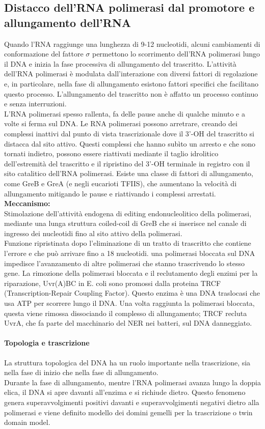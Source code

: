 \documentclass{article}
\begin{document}
\subsection{Distacco dell'RNA polimerasi dal promotore e
allungamento dell'RNA} 
Quando l'RNA raggiunge una lunghezza di 9-12
nucleotidi, alcuni cambiamenti di conformazione del fattore $\sigma$ permettono lo
scorrimento dell'RNA polimerasi lungo il DNA e inizia la fase processiva di
allungamento del trascritto. L'attività dell'RNA polimerasi è modulata dall'interazione con diversi fattori di regolazione e, in particolare, nella fase
di allungamento esistono fattori specifici che facilitano questo processo. L'allungamento del trascritto non è
affatto un processo continuo e senza interruzioni. \\
L'RNA polimerasi spesso rallenta,
fa delle pause anche di qualche minuto e a volte si ferma sul DNA. Le RNA polimerasi possono arretrare, creando dei complessi inattivi
dal punto di vista trascrizionale dove il 3'-OH del trascritto si distacca dal sito
attivo. Questi complessi che hanno subìto un arresto e che sono tornati indietro,
possono essere riattivati mediante il taglio idrolitico dell'estremità del trascritto
e il ripristino del 3'-OH terminale in registro con il sito catalitico dell'RNA
polimerasi. Esiste una classe di fattori di allungamento, come GreB e GreA (e
negli eucarioti TFIIS), che aumentano la velocità di allungamento mitigando
le pause e riattivando i complessi arrestati. \\
\textbf{Meccanismo:}\\Stimolazione dell'attività endogena di editing
endonucleolitico della polimerasi, mediante una lunga struttura coiled-coil di
GreB che si inserisce nel canale di ingresso dei nucleotidi fino al sito attivo della
polimerasi.\\ Funzione ripristinata dopo l'eliminazione di un
tratto di trascritto che contiene l'errore e che può arrivare fino a 18 nucleotidi.
una polimerasi bloccata sul DNA impedisce l'avanzamento di altre
polimerasi che stanno trascrivendo lo stesso gene. La rimozione della polimerasi
bloccata e il reclutamento degli enzimi per la riparazione, Uvr(A)BC in E. coli sono promossi dalla proteina TRCF (Transcription-Repair Coupling Factor).
Questo enzima è una DNA traslocasi che usa ATP per scorrere lungo il DNA.
Una volta raggiunta la polimerasi bloccata, questa viene rimossa dissociando il complesso di allungamento; TRCF recluta UvrA, che fa parte del macchinario
del NER nei batteri, sul DNA danneggiato.
\paragraph{Topologia e trascrizione} 
La struttura topologica del DNA ha un ruolo importante nella trascrizione, sia
nella fase di inizio che nella fase di allungamento.\\
Durante la fase di allungamento, mentre l'RNA polimerasi avanza lungo la doppia
elica, il DNA si apre davanti all'enzima e si richiude dietro. Questo fenomeno
genera superavvolgimenti positivi davanti e superavvolgimenti negativi dietro alla
polimerasi e viene definito modello dei domini gemelli per la trascrizione o
twin domain model.
\end{document}
